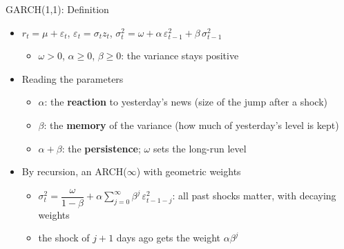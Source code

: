 \begin{frame}{GARCH(1,1): Definition}
\itemsize{\small}
\begin{itemize}
    \item $r_t = \mu + \varepsilon_t$, \quad $\varepsilon_t = \sigma_t z_t$, \quad $\sigma_t^2 = \omega + \alpha\,\varepsilon_{t-1}^2 + \beta\,\sigma_{t-1}^2$
    \begin{itemize}
        \item $\omega > 0$, $\alpha \ge 0$, $\beta \ge 0$: the variance stays positive
    \end{itemize}
    \item Reading the parameters
    \begin{itemize}
        \item $\alpha$: the \textbf{reaction} to yesterday's news (size of the jump after a shock)
        \item $\beta$: the \textbf{memory} of the variance (how much of yesterday's level is kept)
        \item $\alpha + \beta$: the \textbf{persistence}; $\omega$ sets the long-run level
    \end{itemize}
    \item By recursion, an ARCH($\infty$) with geometric weights
    \begin{itemize}
        \item $\sigma_t^2 = \dfrac{\omega}{1 - \beta} + \alpha\sum_{j=0}^{\infty}\beta^j\,\varepsilon_{t-1-j}^2$: all past shocks matter, with decaying weights
        \item the shock of $j + 1$ days ago gets the weight $\alpha\beta^j$
    \end{itemize}
\end{itemize}
\end{frame}

